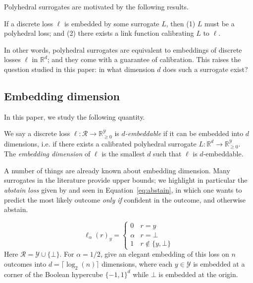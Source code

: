 \documentclass[anon]{colt2020} %
\newcommand{\Comments}{1}
\newcommand{\mynote}[2]{\ifnum\Comments=1\textcolor{#1}{#2}\fi}
\newcommand{\jessie}[1]{\mynote{purple}{[JF: #1]}}
\newcommand{\bo}[1]{\mynote{blue}{[Bo: #1]}}
\newcommand{\reals}{\mathbb{R}}
\newcommand{\nonnegreals}{\reals_{\geq 0}}%
\newcommand{\R}{\mathcal{R}}
\newcommand{\Y}{\mathcal{Y}}
\newcommand{\ellabs}[1]{\ell_{#1}}
\begin{document}
Polyhedral surrogates are motivated by the following results.
\begin{theorem} \label{thm:embed-iff-poly}
  If a discrete loss $\ell$ is embedded by some surrogate $L$, then (1) $L$ must be a polyhedral loss; and (2) there exists a link function calibrating $L$ to $\ell$.
\end{theorem}
In other words, polyhedral surrogates are equivalent to embeddings of discrete losses $\ell$ in $\reals^d$; and they come with a guarantee of calibration.
This raises the question studied in this paper: in what dimension $d$ does such a surrogate exist?

\subsection{Embedding dimension}

In this paper, we study the following quantity.
\begin{definition}
  We say a discrete loss $\ell: \R \to \nonnegreals^{\Y}$ is \emph{$d$-embeddable} if it can be embedded into $d$ dimensions, i.e. if there exists a calibrated polyhedral surrogate $L: \reals^d \to \nonnegreals^{\Y}$.
  The \emph{embedding dimension} of $\ell$ is the smallest $d$ such that $\ell$ is $d$-embeddable.
\end{definition}

A number of things are already known about embedding dimension.
Many surrogates in the literature provide upper bounds; we highlight in particular the \emph{abstain loss} given by \cite{ramaswamy2018consistent} and seen in Equation~\eqref{eq:abstain}, in which one wants to predict the most likely outcome \emph{only if} confident in the outcome, and otherwise abstain.

\begin{equation}\label{eq:abstain}
\ellabs{\alpha}(r)_y = \begin{cases}
0 & r = y\\
\alpha & r = \bot\\
1 & r \not \in \{y, \bot\}
\end{cases}
\end{equation}
Here $\R = \Y \cup \{\bot\}$.
For $\alpha=1/2$, \cite{ramaswamy2018consistent} give an elegant embedding of this loss on $n$ outcomes into $d = \lceil \log_2 (n) \rceil$ dimensions, where each $y \in \Y$ is embedded at a corner of the Boolean hypercube $\{-1,1\}^d$ while $\bot$ is embedded at the origin.
\end{document}
